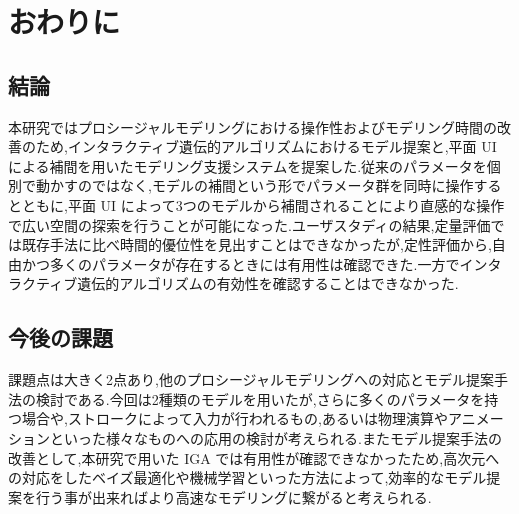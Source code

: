 \newpage

\chapter{おわりに}

\section{結論}
本研究ではプロシージャルモデリングにおける操作性およびモデリング時間の改善のため,インタラクティブ遺伝的アルゴリズムにおけるモデル提案と,平面 UI による補間を用いたモデリング支援システムを提案した.従来のパラメータを個別で動かすのではなく,モデルの補間という形でパラメータ群を同時に操作するとともに,平面 UI によって3つのモデルから補間されることにより直感的な操作で広い空間の探索を行うことが可能になった.ユーザスタディの結果,定量評価では既存手法に比べ時間的優位性を見出すことはできなかったが,定性評価から,自由かつ多くのパラメータが存在するときには有用性は確認できた.一方でインタラクティブ遺伝的アルゴリズムの有効性を確認することはできなかった.
\section{今後の課題}
課題点は大きく2点あり,他のプロシージャルモデリングへの対応とモデル提案手法の検討である.今回は2種類のモデルを用いたが,さらに多くのパラメータを持つ場合や,ストロークによって入力が行われるもの,あるいは物理演算やアニメーションといった様々なものへの応用の検討が考えられる.またモデル提案手法の改善として,本研究で用いた IGA では有用性が確認できなかったため,高次元への対応をしたベイズ最適化\cite{平沼智之2021組合せ最適化におけるベイジアン最適化アルゴリズムを組み込んだ遺伝的アルゴリズムの提案}や機械学習といった方法によって,効率的なモデル提案を行う事が出来ればより高速なモデリングに繋がると考えられる.